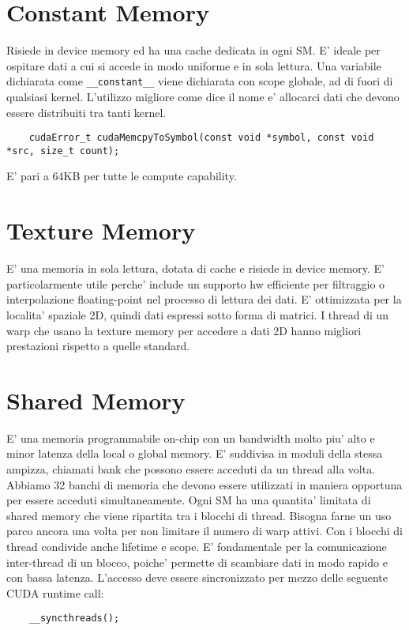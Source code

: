 \section{Constant Memory}
Risiede in device memory ed ha una cache dedicata in ogni SM. E' ideale per ospitare dati a cui si accede in modo uniforme e in sola lettura. 
Una variabile dichiarata come \texttt{\_\_constant\_\_} viene dichiarata con scope globale, ad di fuori di qualsiasi kernel. 
L'utilizzo migliore come dice il nome e' allocarci dati che devono essere distribuiti tra tanti kernel.

\begin{lstlisting}
    cudaError_t cudaMemcpyToSymbol(const void *symbol, const void *src, size_t count);
\end{lstlisting}

E' pari a 64KB per tutte le compute capability.

\section{Texture Memory}
E' una memoria in sola lettura, dotata di cache e risiede in device memory. E' particolarmente utile perche' include un supporto hw efficiente per filtraggio o interpolazione floating-point nel processo di lettura dei dati. E' ottimizzata per la localita' spaziale 2D, quindi dati espressi sotto forma di matrici.
I thread di un warp che usano la texture memory per accedere a dati 2D hanno migliori prestazioni rispetto a quelle standard.

\section{Shared Memory}
E' una memoria programmabile on-chip con un bandwidth molto piu' alto e minor latenza della local o global memory. E' suddivisa in moduli della stessa ampizza, chiamati bank che possono essere acceduti da un thread alla volta.
Abbiamo 32 banchi di memoria che devono essere utilizzati in maniera opportuna per essere acceduti simultaneamente.
Ogni SM ha una quantita' limitata di shared memory che viene ripartita tra i blocchi di thread. 
Bisogna farne un uso parco ancora una volta per non limitare il numero di warp attivi.
Con i blocchi di thread condivide anche lifetime e scope.
E' fondamentale per la comunicazione inter-thread di un blocco, poiche' permette di scambiare dati in modo rapido e con bassa latenza.
L'accesso deve essere sincronizzato per mezzo delle seguente CUDA runtime call:
\begin{lstlisting}
    __syncthreads();
\end{lstlisting}

